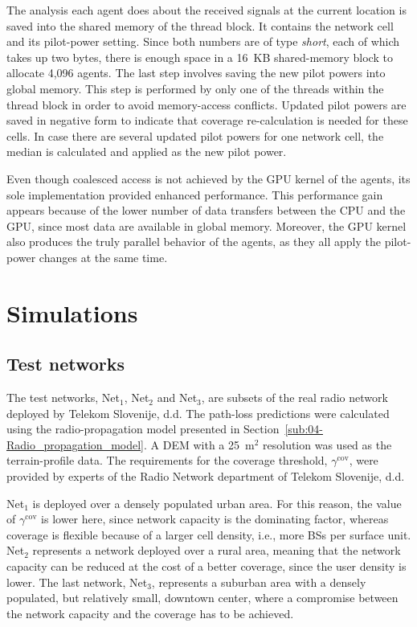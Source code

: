 The analysis each agent does about the received signals at the current
location is saved into the shared memory of the thread block. It contains
the network cell and its pilot-power setting. Since both numbers are
of type \emph{short}, each of which takes up two bytes, there is enough
space in a 16~KB shared-memory block to allocate 4,096 agents. The
last step involves saving the new pilot powers into global memory.
This step is performed by only one of the threads within the thread
block in order to avoid memory-access conflicts. Updated pilot powers
are saved in negative form to indicate that coverage re-calculation
is needed for these cells. In case there are several updated pilot
powers for one network cell, the median is calculated and applied
as the new pilot power.

Even though coalesced access is not achieved by the GPU kernel of
the agents, its sole implementation provided enhanced performance.
This performance gain appears because of the lower number of data
transfers between the CPU and the GPU, since most data are available
in global memory. Moreover, the GPU kernel also produces the truly
parallel behavior of the agents, as they all apply the pilot-power
changes at the same time.


\section{Simulations \label{sec:06-Simulations}}


\subsection{Test networks}

The test networks, Net$_{1}$, Net$_{2}$ and Net$_{3}$, are subsets
of the real radio network deployed by Telekom Slovenije, d.d. The
path-loss predictions were calculated using the radio-propagation
model presented in Section~\ref{sub:04-Radio_propagation_model}.
A DEM with a 25~m$^{2}$ resolution was used as the terrain-profile
data. The requirements for the coverage threshold, $\gamma^{\mathrm{cov}}$,
were provided by experts of the Radio Network department of Telekom
Slovenije, d.d.

Net$_{1}$ is deployed over a densely populated urban area. For this
reason, the value of $\gamma^{\mathrm{cov}}$ is lower here, since
network capacity is the dominating factor, whereas coverage is flexible
because of a larger cell density, i.e., more BSs per surface unit.
Net$_{2}$ represents a network deployed over a rural area, meaning
that the network capacity can be reduced at the cost of a better coverage,
since the user density is lower. The last network, Net$_{3}$, represents
a suburban area with a densely populated, but relatively small, downtown
center, where a compromise between the network capacity and the coverage
has to be achieved.

